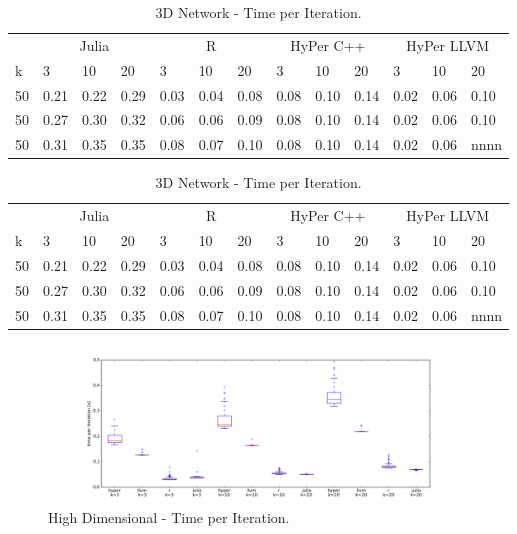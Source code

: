 \begin{table}[htsb]
  \caption[3D Network - Time per Iteration]{3D Network - Time per Iteration.}
  \label{tab:network_all}
  \centering
  \begin{tabular}{l l l l l l l l l l l l l}
    \toprule
      & \multicolumn{3}{c}{Julia} & \multicolumn{3}{c}{R} & \multicolumn{3}{c}{HyPer C++} & \multicolumn{3}{c}{HyPer LLVM}  \\
      k & 3 & 10 & 20 & 3 & 10 & 20 & 3 & 10 & 20 & 3 & 10 & 20 \\
    \midrule
      50  & 0.21 & 0.22 & 0.29 & 0.03 & 0.04 & 0.08 & 0.08 & 0.10 & 0.14 & 0.02 & 0.06 & 0.10 \\
      50  & 0.27 & 0.30 & 0.32 & 0.06 & 0.06 & 0.09 & 0.08 & 0.10 & 0.14 & 0.02 & 0.06 & 0.10 \\
      50  & 0.31 & 0.35 & 0.35 & 0.08 & 0.07 & 0.10 & 0.08 & 0.10 & 0.14 & 0.02 & 0.06 & nnnn \\
    \bottomrule
  \end{tabular}
\end{table}



\begin{table}[htsb]
  \caption[3D Network - Time per Iteration]{3D Network - Time per Iteration.}
  \label{tab:network_all}
  \centering
  \begin{tabular}{l l l l l l l l l l l l l}
    \toprule
      & \multicolumn{3}{c}{Julia} & \multicolumn{3}{c}{R} & \multicolumn{3}{c}{HyPer C++} & \multicolumn{3}{c}{HyPer LLVM}  \\
      k & 3 & 10 & 20 & 3 & 10 & 20 & 3 & 10 & 20 & 3 & 10 & 20 \\
    \midrule
      50  & 0.21 & 0.22 & 0.29 & 0.03 & 0.04 & 0.08 & 0.08 & 0.10 & 0.14 & 0.02 & 0.06 & 0.10 \\
      50  & 0.27 & 0.30 & 0.32 & 0.06 & 0.06 & 0.09 & 0.08 & 0.10 & 0.14 & 0.02 & 0.06 & 0.10 \\
      50  & 0.31 & 0.35 & 0.35 & 0.08 & 0.07 & 0.10 & 0.08 & 0.10 & 0.14 & 0.02 & 0.06 & nnnn \\
    \bottomrule
  \end{tabular}
\end{table}




\begin{figure}[htsb]
  \raggedleft
  \includegraphics[scale=0.4, trim="0cm 1cm 0cm 0cm"]{figures/charts/50000_all}
  \caption[High Dimensional - Time per Iteration]{High Dimensional - Time per Iteration.}
  \label{fig:50000_all}
\end{figure}

